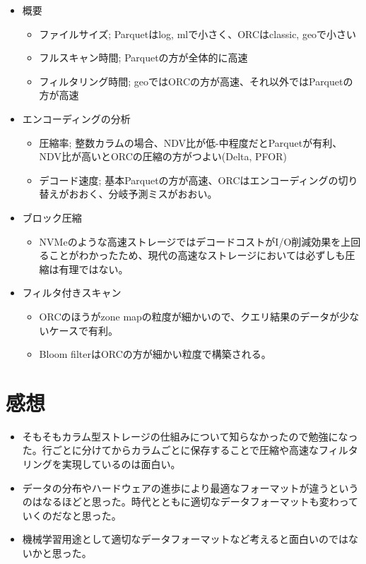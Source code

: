 \documentclass[uplatex]{jsarticle}
\theoremstyle{remark}
\begin{document}
\begin{itemize}
  \item 概要
  \begin{itemize}
    \item ファイルサイズ; Parquetはlog, mlで小さく、ORCはclassic, geoで小さい
    \item フルスキャン時間; Parquetの方が全体的に高速
    \item フィルタリング時間; geoではORCの方が高速、それ以外ではParquetの方が高速
  \end{itemize}
  \item エンコーディングの分析
  \begin{itemize}
    \item 圧縮率; 整数カラムの場合、NDV比が低-中程度だとParquetが有利、NDV比が高いとORCの圧縮の方がつよい(Delta, PFOR)
    \item デコード速度; 基本Parquetの方が高速、ORCはエンコーディングの切り替えがおおく、分岐予測ミスがおおい。
  \end{itemize}
  \item ブロック圧縮
  \begin{itemize}
    \item NVMeのような高速ストレージではデコードコストがI/O削減効果を上回ることがわかったため、現代の高速なストレージにおいては必ずしも圧縮は有理ではない。
  \end{itemize}
  \item フィルタ付きスキャン
  \begin{itemize}
    \item ORCのほうがzone mapの粒度が細かいので、クエリ結果のデータが少ないケースで有利。
    \item Bloom filterはORCの方が細かい粒度で構築される。
  \end{itemize}
\end{itemize}

\section{感想}
\begin{itemize}
  \item そもそもカラム型ストレージの仕組みについて知らなかったので勉強になった。行ごとに分けてからカラムごとに保存することで圧縮や高速なフィルタリングを実現しているのは面白い。
  \item データの分布やハードウェアの進歩により最適なフォーマットが違うというのはなるほどと思った。時代とともに適切なデータフォーマットも変わっていくのだなと思った。
  \item 機械学習用途として適切なデータフォーマットなど考えると面白いのではないかと思った。
\end{itemize}




\end{document}
